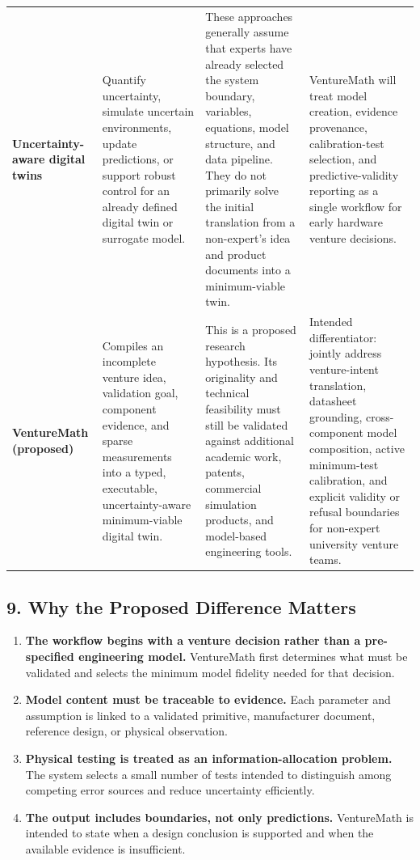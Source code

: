 \documentclass[12pt,letterpaper]{article}
\begin{document}
\begin{longtable}{>{\raggedright\arraybackslash}p{2.5cm} >{\raggedright\arraybackslash}p{4.0cm} >{\raggedright\arraybackslash}p{4.0cm} >{\raggedright\arraybackslash}p{4.5cm}}
\textbf{Uncertainty-aware digital twins} \cite{uadt,envdt}
& Quantify uncertainty, simulate uncertain environments, update predictions, or support robust control for an already defined digital twin or surrogate model.
& These approaches generally assume that experts have already selected the system boundary, variables, equations, model structure, and data pipeline. They do not primarily solve the initial translation from a non-expert's idea and product documents into a minimum-viable twin.
& VentureMath will treat model creation, evidence provenance, calibration-test selection, and predictive-validity reporting as a single workflow for early hardware venture decisions. \\
\addlinespace

\textbf{VentureMath (proposed)}
& Compiles an incomplete venture idea, validation goal, component evidence, and sparse measurements into a typed, executable, uncertainty-aware minimum-viable digital twin.
& This is a proposed research hypothesis. Its originality and technical feasibility must still be validated against additional academic work, patents, commercial simulation products, and model-based engineering tools.
& Intended differentiator: jointly address venture-intent translation, datasheet grounding, cross-component model composition, active minimum-test calibration, and explicit validity or refusal boundaries for non-expert university venture teams. \\

\bottomrule
\end{longtable}
\endgroup

\subsection*{9. Why the Proposed Difference Matters}

\begin{enumerate}
    \item \textbf{The workflow begins with a venture decision rather than a pre-specified engineering model.} VentureMath first determines what must be validated and selects the minimum model fidelity needed for that decision.
    \item \textbf{Model content must be traceable to evidence.} Each parameter and assumption is linked to a validated primitive, manufacturer document, reference design, or physical observation.
    \item \textbf{Physical testing is treated as an information-allocation problem.} The system selects a small number of tests intended to distinguish among competing error sources and reduce uncertainty efficiently.
    \item \textbf{The output includes boundaries, not only predictions.} VentureMath is intended to state when a design conclusion is supported and when the available evidence is insufficient.
\end{enumerate}
\end{document}
